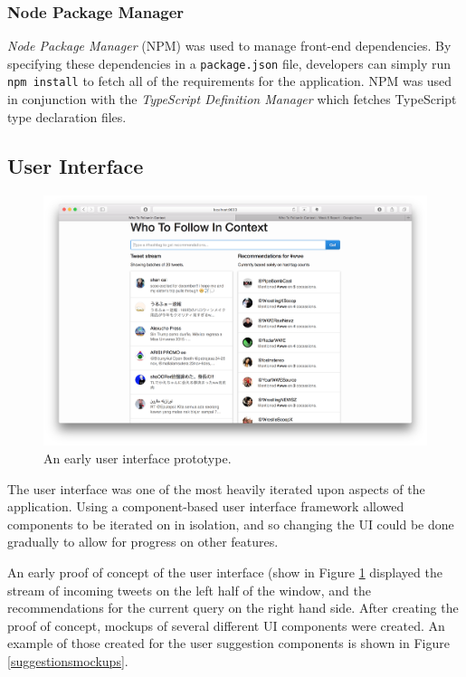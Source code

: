 \documentclass{l4proj}
\newcommand{\code}[1]{\texttt{#1}}
\begin{document}
        \subsubsection{Node Package Manager}
        \textit{Node Package Manager} (NPM) was used to manage front-end dependencies. By specifying these dependencies in a \code{package.json} file, developers can simply run \code{npm install} to fetch all of the requirements for the application. NPM was used in conjunction with the \textit{TypeScript Definition Manager} which fetches TypeScript type declaration files.
        
        \subsection{User Interface}
\begin{figure}
\centering
\includegraphics[scale=0.24]{initialui.png}
\caption{An early user interface prototype.}
\label{initialui}
\end{figure} 
        
        The user interface was one of the most heavily iterated upon aspects of the application. Using a component-based user interface framework allowed components to be iterated on in isolation, and so changing the UI could be done gradually to allow for progress on other features.
        
        An early proof of concept of the user interface (show in Figure \ref{initialui} displayed the stream of incoming tweets on the left half of the window, and the recommendations for the current query on the right hand side. After creating the proof of concept, mockups of several different UI components were created. An example of those created for the user suggestion components is shown in Figure \ref{suggestionsmockups}.
        
\end{document}
